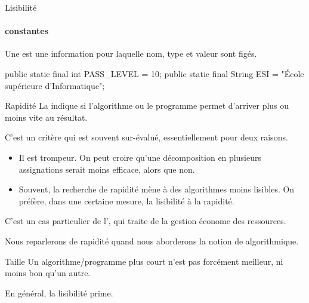 \begin{frame}[fragile]{Lisibilité}
  \framesubtitle{constantes}
  Une  est une information pour laquelle nom, type et
  valeur sont figés.
  \vfill
  \begin{java}
public static final int PASS_LEVEL = 10;
public static final String ESI =
    "École supérieure d'Informatique";
  \end{java}
\end{frame}

\begin{frame}{Rapidité}
  La  indique si l’algorithme ou le programme permet
  d’arriver plus ou moins vite au résultat.

  \pause
  C’est un critère qui est souvent sur-évalué, 
  essentiellement pour deux raisons.
  \begin{itemize}[<+->]
    \item Il est trompeur. On peut croire qu'une décomposition en plusieurs
      assignations serait moins efficace, alors que non.
    \item Souvent, la recherche de rapidité mène à des algorithmes moins
      lisibles. On préfère, dans une certaine mesure, la lisibilité à la
      rapidité.
  \end{itemize}

  \pause
  C'est un cas particulier de l', qui traite de la
  gestion économe des ressources.

  Nous reparlerons de rapidité quand nous aborderons la notion de
   algorithmique.

\end{frame}

\begin{frame}{Taille}
  Un algorithme/programme plus court n'est pas forcément meilleur, ni moins
  bon qu'un autre.

  En général, \alert{la lisibilité prime}.
\end{frame}


